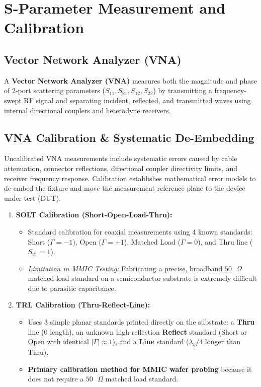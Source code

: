 \documentclass[12pt,a4paper]{article}
\begin{document}
\section{S-Parameter Measurement and Calibration}

\subsection{Vector Network Analyzer (VNA)}
A \textbf{Vector Network Analyzer (VNA)} measures both the magnitude and phase of 2-port scattering parameters ($S_{11}, S_{21}, S_{12}, S_{22}$) by transmitting a frequency-swept RF signal and separating incident, reflected, and transmitted waves using internal directional couplers and heterodyne receivers.

\subsection{VNA Calibration \& Systematic De-Embedding}
Uncalibrated VNA measurements include systematic errors caused by cable attenuation, connector reflections, directional coupler directivity limits, and receiver frequency response. Calibration establishes mathematical error models to de-embed the fixture and move the measurement reference plane to the device under test (DUT).

\begin{enumerate}[leftmargin=*, itemsep=5pt]
  \item \textbf{SOLT Calibration (Short-Open-Load-Thru):}
    \begin{itemize}[leftmargin=*, noitemsep]
      \item Standard calibration for coaxial measurements using 4 known standards: Short ($\Gamma = -1$), Open ($\Gamma = +1$), Matched Load ($\Gamma = 0$), and Thru line ($S_{21} = 1$).
      \item \textit{Limitation in MMIC Testing:} Fabricating a precise, broadband $50\text{ }\Omega$ matched load standard on a semiconductor substrate is extremely difficult due to parasitic capacitance.
    \end{itemize}
  \item \textbf{TRL Calibration (Thru-Reflect-Line):}
    \begin{itemize}[leftmargin=*, noitemsep]
      \item Uses 3 simple planar standards printed directly on the substrate: a \textbf{Thru} line ($0$ length), an unknown high-reflection \textbf{Reflect} standard (Short or Open with identical $|\Gamma| \approx 1$), and a \textbf{Line} standard ($\lambda_g/4$ longer than Thru).
      \item \textbf{Primary calibration method for MMIC wafer probing} because it does not require a $50\text{ }\Omega$ matched load standard.
    \end{itemize}
\end{enumerate}
\end{document}

